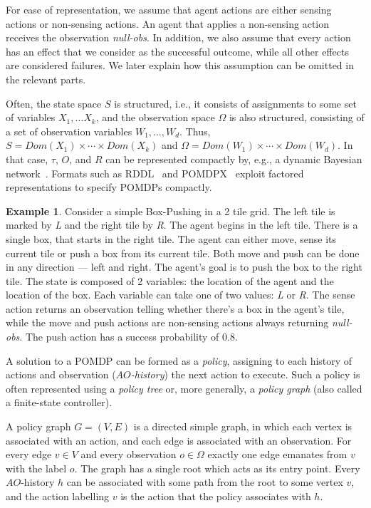 \documentclass[letterpaper]{article} %
\theoremstyle{definition}
\newtheorem{example}{Example}
\begin{document}
For ease of representation, we assume that agent actions are either sensing actions or non-sensing actions. An agent that applies a non-sensing action receives the observation {\em null-obs}. In addition, we also assume that every action has 
an effect that we consider as the successful outcome, while all other effects are considered failures. We later explain how this assumption can be omitted in the relevant parts.

Often, the state space $S$ is structured, i.e., it consists of assignments to some set of variables $X_1,\ldots X_k$, and the observation space $\Omega$ is
also structured, consisting of a set of observation variables $W_1,\ldots, W_d$. 
Thus, $S=Dom(X_1)\times\cdots\times Dom(X_k)$ and
$\Omega = Dom(W_1)\times\cdots\times Dom(W_d)$. 
In that case, $\tau$, $O$, and $R$ can be represented compactly by, e.g., a dynamic Bayesian network~\cite{BAYESNETWORK}. Formats such as RDDL~\cite{RDDL} and POMDPX~\cite{POMDPX}
exploit factored representations to specify POMDPs compactly.

\begin{example}
Consider a simple Box-Pushing in a 2 tile grid. The left tile is marked by \emph{L} and the right tile by \emph{R}. The agent begins in the left tile. There is a single box, that starts in the right tile. The agent can either move, sense its current tile or push a box from its current tile. Both move and push can be done in any direction --- left and right. The agent's goal is to push the box to the right tile.
The state is composed of 2 variables: the location of the agent and the location of the box. Each variable can take one of two values: \emph{L} or \emph{R}.
The sense action returns an observation telling whether there's a box in the agent's tile, while the move and push actions are non-sensing actions always returning {\em null-obs}.
The push action has a success probability of 0.8.
\end{example}

A solution to a POMDP can be formed as a {\em policy}, assigning to each history of actions and observation ({\em $AO$-history}) the next action to execute. 
Such a policy is often represented using a {\em policy tree} or, more generally, a {\em policy graph} (also called a finite-state controller). 

A policy graph $G=(V,E)$ is a directed simple graph, in which each vertex is associated with an action, and each edge is associated with an observation.
For every edge $v\in V$ and every observation $o\in\Omega$ exactly one edge emanates from $v$ with the label $o$.
The graph has a single root which acts as its entry point. Every $AO$-history $h$ can be associated with some path from the root to some vertex $v$,
and the action labelling $v$ is the action that the policy associates with $h$.
\end{document}

